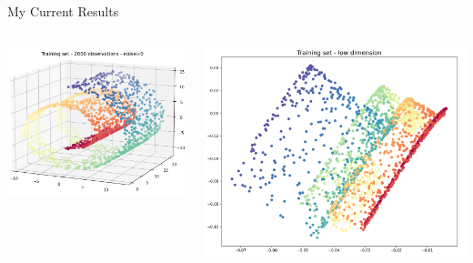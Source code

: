 \documentclass{beamer}
\begin{document}
\begin{frame}{My Current Results}
    \begin{columns} %
        \begin{column}{.5\textwidth} %
            \includegraphics[width=1\linewidth]{images/train_h.png}
        \end{column}
        \begin{column}{.5\textwidth} %
            \includegraphics[width=1\linewidth]{images/train_l.png}
        \end{column}
    \end{columns}
\end{frame}
\end{document}
